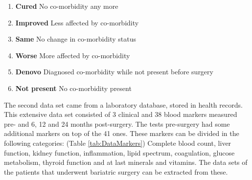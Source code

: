 \documentclass[10pt,a4paper]{article}
\begin{document}
	\begin{enumerate}
		\item \textbf{Cured} No co-morbidity any more		
		\item \textbf{Improved} Less affected by co-morbidity
		\item \textbf{Same} No change in co-morbidity status
		\item \textbf{Worse} More affected by co-morbidity
		\item \textbf{Denovo} Diagnosed co-morbidity while not present before surgery
		\item \textbf{Not present} No co-morbidity present				
	\end{enumerate}

	The second data set came from a laboratory database, stored in health records. This extensive data set consisted of 3 clinical and 38 blood markers measured pre- and 6, 12 and 24 months post-surgery. The tests pre-surgery had some additional markers on top of the 41 ones. These markers can be divided in the following categories: (Table \ref{tab:DataMarkers}) Complete blood count, liver function, kidney function, inflammation, lipid spectrum, coagulation, glucose metabolism, thyroid function and at last minerals and vitamins. The data sets of the patients that underwent bariatric surgery can be extracted from these.
	
\end{document}
